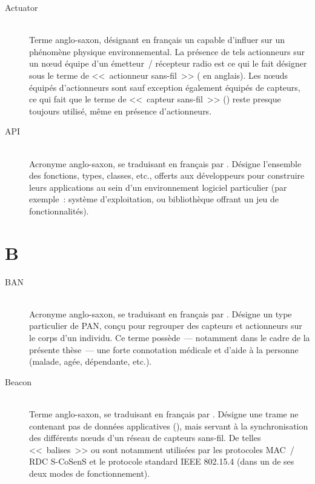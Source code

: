\begin{description}

\item[Actuator] \ \\
Terme anglo-saxon, désignant en français un  capable
d'influer sur un phénomène physique environnemental. La présence de tels
actionneurs sur un n{\oe}ud équipe d'un émetteur~/ récepteur radio est
ce qui le fait désigner sous le terme de <<~actionneur sans-fil~>>
( en anglais). Les n{\oe}uds équipés
d'actionneurs sont sauf exception également équipés de capteurs, ce qui fait
que le terme de <<~capteur sans-fil~>> () reste
presque toujours utilisé, même en présence d'actionneurs.

\item[API]  \\
Acronyme anglo-saxon, se traduisant en français par . Désigne l'ensemble des fonctions, types,
classes, etc., offerts aux développeurs pour construire leurs applications
au sein d'un environnement logiciel particulier (par exemple~: système
d'exploitation, ou bibliothèque offrant un jeu de fonctionnalités).

\end{description}


\section*{B}

\begin{description}

\item[BAN]  \\
Acronyme anglo-saxon, se traduisant en français par . Désigne un type particulier de PAN, conçu pour
regrouper des capteurs et actionneurs sur le corps d'un individu.
Ce terme possède~--- notamment dans le cadre de la présente thèse~--- une
forte connotation médicale et d'aide à la personne (malade, agée,
dépendante, etc.).

\item[Beacon] \ \\
Terme anglo-saxon, se traduisant en français par .
Désigne une trame ne contenant pas de données applicatives
(), mais servant à la synchronisation des différents
n{\oe}uds d'un réseau de capteurs sans-fil. De telles <<~balises~>> ou
 sont notamment utilisées par les protocoles MAC~/ RDC
S-CoSenS et le protocole standard IEEE 802.15.4 (dans un de ses deux modes
de fonctionnement).

\end{description}

